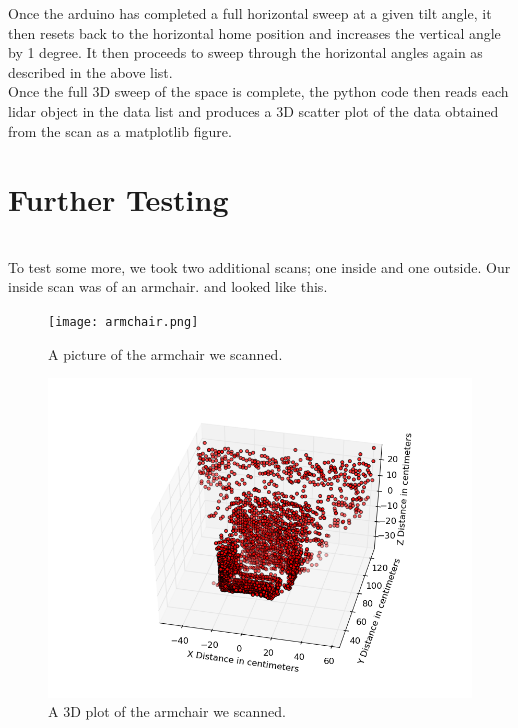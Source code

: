 \documentclass{article}
\begin{document}
Once the arduino has completed a full horizontal sweep at a given tilt angle, it then resets back to the horizontal home position and increases the vertical angle by 1 degree. It then proceeds to sweep through the horizontal angles again as described in the above list. \\

Once the full 3D sweep of the space is complete, the python code then reads each lidar object in the data list and produces a 3D scatter plot of the data obtained from the scan as a matplotlib figure.

\section{Further Testing}\ \\
To test some more, we took two additional scans; one inside and one outside. Our inside scan was of an armchair. and looked like this. 

\begin{figure}[h!]
\begin{center}
\texttt{[image: armchair.png]}
\caption{A picture of the armchair we scanned.}
\end{center}
\end{figure}

\begin{figure}[h!]
\begin{center}
\includegraphics[scale=0.9]{armchair_scan2.png}
\caption{A 3D plot of the armchair we scanned.}
\end{center}
\end{figure}
\end{document}
